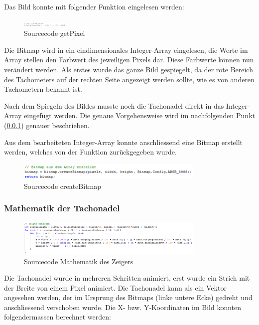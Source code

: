 Das Bild konnte mit folgender Funktion eingelesen werden:

\begin{figure}[ht]
    \includegraphics[width=0.2\textwidth]{3Vorgehen/imag/app_getPixel.png}
    \caption{Sourcecode getPixel}
	\label{app_getPixel} 
\end{figure}

Die Bitmap wird in ein eindimensionales Integer-Array eingelesen, die Werte im Array stellen den Farbwert des jeweiligen Pixels dar. Diese Farbwerte können nun verändert werden. Als erstes wurde das ganze Bild gespiegelt, da der rote Bereich des Tachometers auf der rechten Seite angezeigt werden sollte, wie es von anderen Tachometern bekannt ist.

Nach dem Spiegeln des Bildes musste noch die Tachonadel direkt in das Integer-Array eingefügt werden. Die genaue Vorgehensweise wird im nachfolgenden Punkt (\ref{math_tachonadel}) genauer beschrieben.

Aus dem bearbeiteten Integer-Array konnte anschliessend eine Bitmap erstellt werden, welches von der Funktion zurückgegeben wurde. 

\begin{figure}[ht]
    \includegraphics[width=0.8\textwidth]{3Vorgehen/imag/app_createBitmap.png}
    \caption{Sourcecode createBitmap}
	\label{app_createBitmap} 
\end{figure}

\subsubsection{Mathematik der Tachonadel}
\label{math_tachonadel}

\begin{figure}[ht]
    \includegraphics[width=0.8\textwidth]{3Vorgehen/imag/app_drawNeedle.png}
    \caption{Sourcecode Mathematik des Zeigers}
	\label{app_drawNeedle} 
\end{figure}

Die Tachonadel wurde in mehreren Schritten animiert, erst wurde ein Strich mit der Breite von einem Pixel animiert. Die Tachonadel kann als ein Vektor angesehen werden, der im Ursprung des Bitmaps (linke untere Ecke) gedreht und anschliessend verschoben wurde. Die X- bzw. Y-Koordinaten im Bild konnten folgendermassen berechnet werden:

